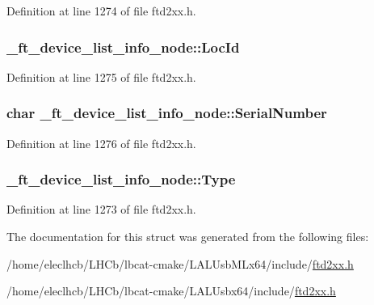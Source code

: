 Definition at line 1274 of file ftd2xx.h.\hypertarget{struct__ft__device__list__info__node_a11f8898a6bc9a91abadb14c02cac4394}{
\subsubsection[{LocId}]{ {\bf \_\-ft\_\-device\_\-list\_\-info\_\-node::LocId}}}
\label{struct__ft__device__list__info__node_a11f8898a6bc9a91abadb14c02cac4394}


Definition at line 1275 of file ftd2xx.h.\hypertarget{struct__ft__device__list__info__node_a833aa1d16c8e1034840397921ae92413}{
\subsubsection[{SerialNumber}]{\setlength{\rightskip}{0pt plus 5cm}char {\bf \_\-ft\_\-device\_\-list\_\-info\_\-node::SerialNumber}}}
\label{struct__ft__device__list__info__node_a833aa1d16c8e1034840397921ae92413}


Definition at line 1276 of file ftd2xx.h.\hypertarget{struct__ft__device__list__info__node_aa764a1406eb904ad4444a82f2f950b4e}{
\subsubsection[{Type}]{ {\bf \_\-ft\_\-device\_\-list\_\-info\_\-node::Type}}}
\label{struct__ft__device__list__info__node_aa764a1406eb904ad4444a82f2f950b4e}


Definition at line 1273 of file ftd2xx.h.

The documentation for this struct was generated from the following files:\begin{DoxyCompactItemize}
\item 
/home/eleclhcb/LHCb/lbcat-\/cmake/LALUsbMLx64/include/\hyperlink{LALUsbMLx64_2include_2ftd2xx_8h}{ftd2xx.h}\item 
/home/eleclhcb/LHCb/lbcat-\/cmake/LALUsbx64/include/\hyperlink{LALUsbx64_2include_2ftd2xx_8h}{ftd2xx.h}\end{DoxyCompactItemize}
